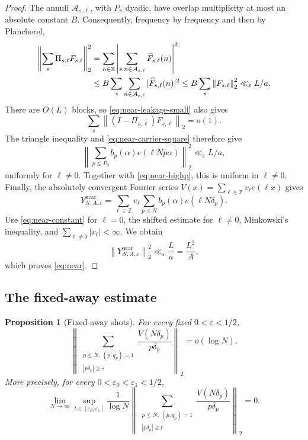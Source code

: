 \documentclass[11pt]{article}
\numberwithin{equation}{section}
\newtheorem{proposition}[theorem]{Proposition}
\theoremstyle{definition}
\newcommand{\Z}{\mathbb Z}
\newcommand{\1}{\mathbf 1}
\newcommand{\norm}[1]{\left\lVert#1\right\rVert}
\begin{document}
\begin{proof}
The annuli \(\mathcal A_{s,\ell}\), with \(P_s\) dyadic, have overlap
multiplicity at most an absolute constant \(B\).  Consequently,
frequency by frequency and then by Plancherel,
\begin{align}
 \left\|\sum_s\Pi_{s,\ell}F_{s,\ell}\right\|_2^2
 &=\sum_{n\in\Z}
 \left|\sum_{s:n\in\mathcal A_{s,\ell}}
 \widehat F_{s,\ell}(n)\right|^2\notag\\
 &\le B\sum_s\sum_{n\in\mathcal A_{s,\ell}}
 |\widehat F_{s,\ell}(n)|^2
 \le B\sum_s\norm{F_{s,\ell}}_2^2
 \ll_\varepsilon L/a.
 \label{eq:near-carrier-square}
\end{align}
There are \(O(L)\) blocks, so \eqref{eq:near-leakage-small} also gives
\[
 \sum_s\norm{(I-\Pi_{s,\ell})F_{s,\ell}}_2=o(1).
\]
The triangle inequality and \eqref{eq:near-carrier-square} therefore
give
\begin{equation}\label{eq:near-lowp-shifted}
 \left\|\sum_{p\le P_0}b_p(\alpha)e(\ell Np\alpha)\right\|_2^2
 \ll_\varepsilon L/a,
\end{equation}
uniformly for \(\ell\ne0\).
Together with \eqref{eq:near-highp}, this is uniform in
\(\ell\ne0\).  Finally, the absolutely convergent Fourier series
\(V(x)=\sum_{\ell\in\Z}v_\ell e(\ell x)\) gives
\[
 Y^{\mathrm{near}}_{N,A,\varepsilon}
 =\sum_{\ell\in\Z}v_\ell
 \sum_{p\le N}b_p(\alpha)e(\ell N\delta_p).
\]
Use \eqref{eq:near-constant} for \(\ell=0\), the shifted estimate for
\(\ell\ne0\), Minkowski's inequality, and
\(\sum_{\ell\ne0}|v_\ell|<\infty\).  We obtain
\[
 \norm{Y^{\mathrm{near}}_{N,A,\varepsilon}}_2^2
 \ll_\varepsilon\frac La=\frac{L^2}{A},
\]
which proves \eqref{eq:near}.
\end{proof}

\subsection{The fixed-away estimate}

\begin{proposition}[Fixed-away shots]\label{prop:far}
For every fixed \(0<\varepsilon<1/2\),
\begin{equation}\label{eq:far}
 \left\|
 \sum_{\substack{p\le N,\ (p,q_p)=1\\
                  |p\delta_p|\ge\varepsilon}}
 \frac{V(N\delta_p)}{p\delta_p}
 \right\|_2=o(\log N).
\end{equation}
More precisely, for every \(0<\varepsilon_0<\varepsilon_1<1/2\),
\begin{equation}\label{eq:far-uniform}
 \lim_{N\to\infty}
 \sup_{t\in[\varepsilon_0,\varepsilon_1]}
 \frac1{\log N}
 \left\|
 \sum_{\substack{p\le N,\ (p,q_p)=1\\|p\delta_p|\ge t}}
 \frac{V(N\delta_p)}{p\delta_p}
 \right\|_2=0.
\end{equation}
\end{proposition}
\end{document}
